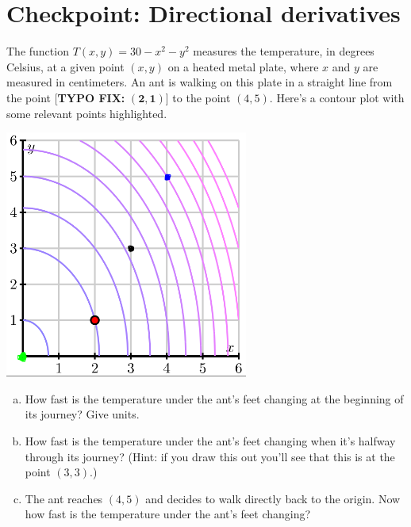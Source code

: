 


%


\allowdisplaybreaks
\section{Checkpoint: Directional derivatives}
The function $T(x,y) = 30 - x^2 - y^2$ measures the temperature, in degrees Celsius, at a given point $(x,y)$ on a heated metal plate, where $x$ and $y$ are measured in centimeters. An ant is walking on this plate in a straight line from the point [\textbf{TYPO FIX:} $\mathbf{(2,1)}$] to the point $(4,5)$. Here's a contour plot with some relevant points highlighted.

\includegraphics[width=0.6\textwidth]{../images/checkpoint-directional-derivatives.png}

\begin{enumerate}[(a)]
    \item How fast is the temperature under the ant's feet changing at the beginning of its journey? Give units.
    \item How fast is the temperature under the ant's feet changing when it's halfway through its journey? (Hint: if you draw this out you'll see that this is at the point $(3,3)$.)
    \item The ant reaches $(4,5)$ and decides to walk directly back to the origin. Now how fast is the temperature under the ant's feet changing?
\end{enumerate}
	

